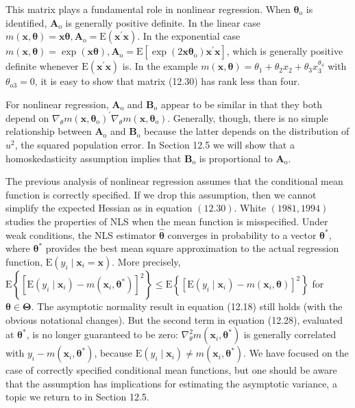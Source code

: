 \documentclass[10pt]{article}
\begin{document}
This matrix plays a fundamental role in nonlinear regression. When $\boldsymbol{\theta}_{\mathrm{o}}$ is identified, $\mathbf{A}_{\mathrm{o}}$ is generally positive definite. In the linear case $m(\mathbf{x}, \boldsymbol{\theta})=\mathbf{x} \boldsymbol{\theta}, \mathbf{A}_{\mathrm{o}}=\mathrm{E}\left(\mathbf{x}^{\prime} \mathbf{x}\right)$. In the exponential case $m(\mathbf{x}, \boldsymbol{\theta})=\exp (\mathbf{x} \boldsymbol{\theta}), \mathbf{A}_{\mathrm{o}}=\mathrm{E}\left[\exp \left(2 \mathbf{x} \boldsymbol{\theta}_{\mathrm{o}}\right) \mathbf{x}^{\prime} \mathbf{x}\right]$, which is generally positive definite whenever $\mathrm{E}\left(\mathbf{x}^{\prime} \mathbf{x}\right)$ is. In the example $m(\mathbf{x}, \boldsymbol{\theta})=\theta_{1}+\theta_{2} x_{2}+\theta_{3} x_{3}^{\theta_{4}}$ with $\theta_{\mathrm{o} 3}=0$, it is easy to show that matrix (12.30) has rank less than four.

For nonlinear regression, $\mathbf{A}_{\mathrm{o}}$ and $\mathbf{B}_{\mathrm{o}}$ appear to be similar in that they both depend on $\nabla_{\theta} m\left(\mathbf{x}, \boldsymbol{\theta}_{\mathrm{o}}\right)^{\prime} \nabla_{\theta} m\left(\mathbf{x}, \boldsymbol{\theta}_{\mathrm{o}}\right)$. Generally, though, there is no simple relationship between $\mathbf{A}_{\mathrm{o}}$ and $\mathbf{B}_{\mathrm{o}}$ because the latter depends on the distribution of $u^{2}$, the squared population error. In Section 12.5 we will show that a homoskedasticity assumption implies that $\mathbf{B}_{\mathrm{o}}$ is proportional to $\mathbf{A}_{\mathrm{o}}$.

The previous analysis of nonlinear regression assumes that the conditional mean function is correctly specified. If we drop this assumption, then we cannot simplify the expected Hessian as in equation $(12.30)$. White $(1981,1994)$ studies the properties of NLS when the mean function is misspecified. Under weak conditions, the NLS estimator $\hat{\boldsymbol{\theta}}$ converges in probability to a vector $\boldsymbol{\theta}^{*}$, where $\boldsymbol{\theta}^{*}$ provides the best mean square approximation to the actual regression function, $\mathrm{E}\left(y_{i} \mid \mathbf{x}_{i}=\mathbf{x}\right)$. More precisely, $\mathrm{E}\left\{\left[\mathrm{E}\left(y_{i} \mid \mathbf{x}_{i}\right)-m\left(\mathbf{x}_{i}, \boldsymbol{\theta}^{*}\right)\right]^{2}\right\} \leq \mathrm{E}\left\{\left[\mathrm{E}\left(y_{i} \mid \mathbf{x}_{i}\right)-m\left(\mathbf{x}_{i}, \boldsymbol{\theta}\right)\right]^{2}\right\}$ for $\boldsymbol{\theta} \in \boldsymbol{\Theta}$. The asymptotic normality result in equation (12.18) still holds (with the obvious notational changes). But the second term in equation (12.28), evaluated at $\boldsymbol{\theta}^{*}$, is no longer guaranteed to be zero: $\nabla_{\theta}^{2} m\left(\mathbf{x}_{i}, \boldsymbol{\theta}^{*}\right)$ is generally correlated with $y_{i}-m\left(\mathbf{x}_{i}, \boldsymbol{\theta}^{*}\right)$, because $\mathrm{E}\left(y_{i} \mid \mathbf{x}_{i}\right) \neq m\left(\mathbf{x}_{i}, \boldsymbol{\theta}^{*}\right)$. We have focused on the case of correctly specified conditional mean functions, but one should be aware that the assumption has implications for estimating the asymptotic variance, a topic we return to in Section 12.5.
\end{document}
